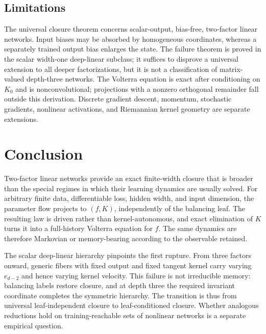 \documentclass[11pt]{article}
\begin{document}
\subsection{Limitations}

The universal closure theorem concerns scalar-output, bias-free, two-factor linear networks.  Input biases may be absorbed by homogeneous coordinates, whereas a separately trained output bias enlarges the state.  The failure theorem is proved in the scalar width-one deep-linear subclass; it suffices to disprove a universal extension to all deeper factorizations, but it is not a classification of matrix-valued depth-three networks.  The Volterra equation is exact after conditioning on $K_0$ and is nonconvolutional; projections with a nonzero orthogonal remainder fall outside this derivation.  Discrete gradient descent, momentum, stochastic gradients, nonlinear activations, and Riemannian kernel geometry are separate extensions.

\section{Conclusion}

Two-factor linear networks provide an exact finite-width closure that is broader than the special regimes in which their learning dynamics are usually solved.  For arbitrary finite data, differentiable loss, hidden width, and input dimension, the parameter flow projects to $(f,K)$, independently of the balancing leaf.  The resulting law is driven rather than kernel-autonomous, and exact elimination of $K$ turns it into a full-history Volterra equation for $f$.  The same dynamics are therefore Markovian or memory-bearing according to the observable retained.

The scalar deep-linear hierarchy pinpoints the first rupture.  From three factors onward, generic fibers with fixed output and fixed tangent kernel carry varying $e_{d-2}$ and hence varying kernel velocity.  This failure is not irreducible memory: balancing labels restore closure, and at depth three the required invariant coordinate completes the symmetric hierarchy.  The transition is thus from universal leaf-independent closure to leaf-conditioned closure.  Whether analogous reductions hold on training-reachable sets of nonlinear networks is a separate empirical question.



\end{document}
